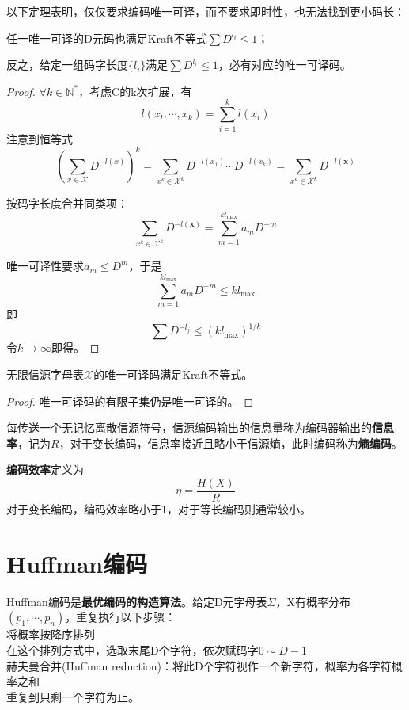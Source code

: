 \documentclass{ctexbook}
\begin{document}
以下定理表明，仅仅要求编码唯一可译，而不要求即时性，也无法找到更小码长：
\begin{theorem}[McMillan定理]
    任一唯一可译的D元码也满足Kraft不等式$\sum D^{l_i}\leq 1$；
    
    反之，给定一组码字长度$\{l_i\}$满足$\sum D^{l_i}\leq 1$，必有对应的唯一可译码。
\end{theorem}
\begin{proof}
    $\forall k\in\mathbb{N} ^*$，考虑C的k次扩展，有
    \[l(x_!,\cdots,x_k)=\sum_{i=1}^k l(x_i)\]
    注意到恒等式
    \[\left(\sum_{x\in\mathcal{X}}D^{-l(x)}\right)^k=\sum_{x^k\in\mathcal{X}^k}D^{-l(x_1)}\cdots D^{-l(x_k)}=\sum_{x^k\in\mathcal{X}^k}D^{-l(\mathbf{x})}\]

    按码字长度合并同类项：
    \[\sum_{x^k\in\mathcal{X}^k}D^{-l(\mathbf{x})}=\sum_{m=1}^{kl_{\max}}a_m D^{-m}\]

    唯一可译性要求$a_m\leq D^m$，于是
    \[\sum_{m=1}^{kl_{\max}}a_m D^{-m}\leq k l_{\max}\]
    即
    \[\sum D^{-l_j}\leq(k l_{\max})^{1/k}\]
    令$k\to\infty$即得。
\end{proof}
\begin{corollary}
    无限信源字母表$\mathcal{X}$的唯一可译码满足Kraft不等式。
\end{corollary}
\begin{proof}
    唯一可译码的有限子集仍是唯一可译的。
\end{proof}

\begin{definition}[信息率]
    每传送一个无记忆离散信源符号，信源编码输出的信息量称为编码器输出的\textbf{信息率}，记为$R$，对于变长编码，信息率接近且略小于信源熵，此时编码称为\textbf{熵编码}。

    \textbf{编码效率}定义为
    $$\eta=\frac{H(X)}{R}$$
    对于变长编码，编码效率略小于1，对于等长编码则通常较小。
\end{definition}

\section{Huffman编码}

Huffman编码是\textbf{最优编码的构造算法}。给定D元字母表$\Sigma$，X有概率分布$(p_1,\cdots,p_n)$，重复执行以下步骤：\\
将概率按降序排列\\
在这个排列方式中，选取末尾D个字符，依次赋码字$0\sim D-1$\\
赫夫曼合并(Huffman reduction)：将此D个字符视作一个新字符，概率为各字符概率之和\\
重复到只剩一个字符为止。
\end{document}

